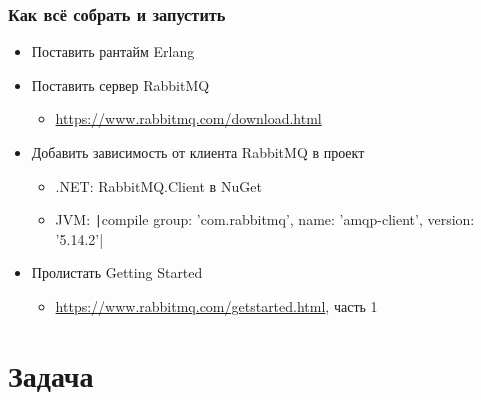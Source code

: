 \documentclass[xetex,mathserif,serif]{beamer}
\begin{document}
    \begin{frame}
        \frametitle{Как всё собрать и запустить}
        \begin{itemize}
            \item Поставить рантайм Erlang
            \item Поставить сервер RabbitMQ
            \begin{itemize}
                \item \url{https://www.rabbitmq.com/download.html}
            \end{itemize}
            \item Добавить зависимость от клиента RabbitMQ в проект
            \begin{itemize}
                \item .NET: RabbitMQ.Client в NuGet
                \item JVM: \texttt|compile group: 'com.rabbitmq', name: 'amqp-client', version: '5.14.2'|
            \end{itemize}
            \item Пролистать Getting Started 
            \begin{itemize}
                \item \url{https://www.rabbitmq.com/getstarted.html}, часть 1
            \end{itemize}
        \end{itemize}
    \end{frame}

    \section{Задача}
\end{document}

